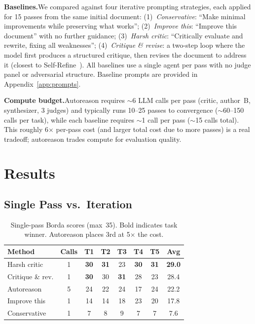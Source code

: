 \documentclass[11pt]{article}
\begin{document}
\textbf{Baselines.}\enspace We compared against four iterative prompting strategies, each applied for 15 passes from the same initial document: (1)~\textit{Conservative}: ``Make minimal improvements while preserving what works''; (2)~\textit{Improve this}: ``Improve this document'' with no further guidance; (3)~\textit{Harsh critic}: ``Critically evaluate and rewrite, fixing all weaknesses''; (4)~\textit{Critique \& revise}: a two-step loop where the model first produces a structured critique, then revises the document to address it (closest to Self-Refine~\cite{selfrefine}). All baselines use a single agent per pass with no judge panel or adversarial structure. Baseline prompts are provided in Appendix~\ref{app:prompts}.

\textbf{Compute budget.}\enspace Autoreason requires ${\sim}$6 LLM calls per pass (critic, author~B, synthesizer, 3 judges) and typically runs 10--25 passes to convergence (${\sim}$60--150 calls per task), while each baseline requires ${\sim}$1 call per pass (${\sim}$15 calls total). This roughly 6$\times$ per-pass cost (and larger total cost due to more passes) is a real tradeoff; autoreason trades compute for evaluation quality.

\section{Results}

\subsection{Single Pass vs.\ Iteration}
\label{sec:v1}

\begin{table}[H]
\centering
\small
\begin{tabular}{@{}lccccccc@{}}
\toprule
\textbf{Method} & \textbf{Calls} & \textbf{T1} & \textbf{T2} & \textbf{T3} & \textbf{T4} & \textbf{T5} & \textbf{Avg} \\
\midrule
\rowcolor{TableShade}
Harsh critic & 1 & \textbf{30} & \textbf{31} & 23 & \textbf{30} & \textbf{31} & \textbf{29.0} \\
Critique \& rev. & 1 & \textbf{30} & 30 & \textbf{31} & 28 & 23 & 28.4 \\
\rowcolor{TableShade}
Autoreason & 5 & 24 & 22 & 24 & 17 & 24 & 22.2 \\
Improve this & 1 & 14 & 14 & 18 & 23 & 20 & 17.8 \\
\rowcolor{TableShade}
Conservative & 1 & 7 & 8 & 9 & 7 & 7 & 7.6 \\
\bottomrule
\end{tabular}
\caption{Single-pass Borda scores (max~35). Bold indicates task winner. Autoreason places 3rd at 5$\times$ the cost.}
\label{tab:v1}
\end{table}
\end{document}
